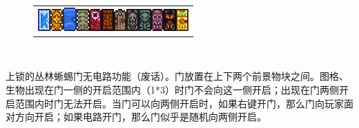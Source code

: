 \begin{figure}[!ht]
{\begin{tabular}[b]{c}
\quad\includegraphics{figures/Frozen_Door.png}\quad\includegraphics{figures/Honey_Door.png}\quad\includegraphics{figures/Slime_Door.png}\quad\includegraphics{figures/Bone_Door.png}\quad\includegraphics{figures/Flesh_Door.png}\quad\includegraphics{figures/Lihzahrd_Door.png}\quad\includegraphics{figures/Dungeon_Door.png}\quad\includegraphics{figures/Blue_Dungeon_Door.png}\quad\includegraphics{figures/Green_Dungeon_Door.png}\quad\includegraphics{figures/Pink_Dungeon_Door.png}\quad\includegraphics{figures/Obsidian_Door.png}\quad\includegraphics{figures/Golden_Door.png}
\end{tabular}}%
\\
\qquad
{}
\caption{}
\end{figure}
上锁的丛林蜥蜴门无电路功能（废话）。门放置在上下两个前景物块之间。图格、生物出现在门一侧的开启范围内（1*3）时门不会向这一侧开启；出现在门两侧开启范围内时门无法开启。当门可以向两侧开启时，如果右键开门，那么门向玩家面对方向开启；如果电路开门，那么门似乎是随机向两侧开启。

